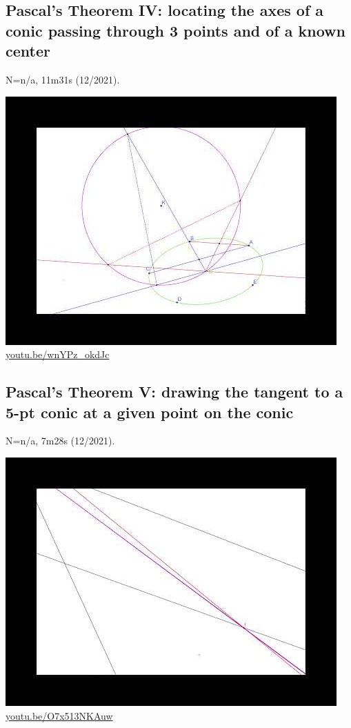 \documentclass[12pt]{amsart}
\begin{document}
\subsection{Pascal's Theorem IV: locating the axes of a conic passing through 3 points and of a known center}
\label{vid:wnYPz_okdJc}
\noindent N=n/a, 11m31s (12/2021). 
\begin{center}\includegraphics[width=.5\textwidth]{pics/wnYPz_okdJc.jpg} \\ 
\href{https://youtu.be/wnYPz_okdJc}{\url{youtu.be/wnYPz\_okdJc}}\end{center}
% 
\subsection{Pascal's Theorem V: drawing the tangent to a 5-pt conic at a given point on the conic}
\label{vid:O7x513NKAuw}
\noindent N=n/a, 7m28s (12/2021). 
\begin{center}\includegraphics[width=.5\textwidth]{pics/O7x513NKAuw.jpg} \\ 
\href{https://youtu.be/O7x513NKAuw}{\url{youtu.be/O7x513NKAuw}}\end{center}
% 
\end{document}
